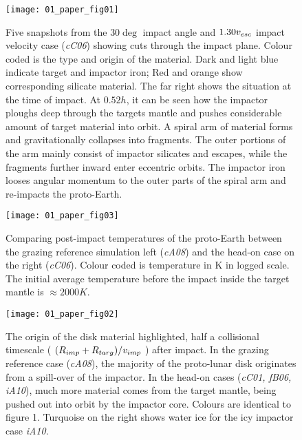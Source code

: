 \begin{figure}
\begin{center}
\texttt{[image: 01\_paper\_fig01]}
\caption{Five snapshots from the $30 \deg$ impact angle and $1.30 v_{esc}$ impact velocity case (\emph{cC06}) showing cuts through the impact plane. Colour coded is the type and origin of the material. Dark and light blue indicate target and impactor iron; Red and orange show corresponding silicate material. The far right shows the situation at the time of impact. At $0.52 h$, it can be seen how the impactor ploughs deep through the targets mantle and pushes considerable amount of target material into orbit. A spiral arm of material forms and gravitationally collapses into fragments. The outer portions of the arm mainly consist of impactor silicates and escapes, while the fragments further inward enter eccentric orbits. The impactor iron looses angular momentum to the outer parts of the spiral arm and re-impacts the proto-Earth.}
\label{ch05_fig01a}
\end{center}
\end{figure}

\begin{figure}
\begin{center}
\texttt{[image: 01\_paper\_fig03]}
\caption{Comparing post-impact temperatures of the proto-Earth between the grazing reference simulation left (\emph{cA08}) and the head-on case on the right (\emph{cC06}). Colour coded is temperature in K in logged scale. The initial average temperature before the impact inside the target mantle is $\approx 2000 K$.}
\label{ch05_fig01c}
\end{center}
\end{figure}

\begin{figure}
\begin{center}
\texttt{[image: 01\_paper\_fig02]}
\caption{The origin of the disk material highlighted, half a collisional timescale ( $ (R_{imp} + R_{targ}) / v_{imp}$ ) after impact. In the grazing reference case (\emph{cA08}), the majority of the proto-lunar disk originates from a spill-over of the impactor. In the head-on cases (\emph{cC01, fB06, iA10}), much more material comes from the target mantle, being pushed out into orbit by the impactor core. Colours are
identical to figure 1. Turquoise on the right shows water ice for the icy impactor case \emph{iA10}.}
\label{ch05_fig01b}
\end{center}
\end{figure}









